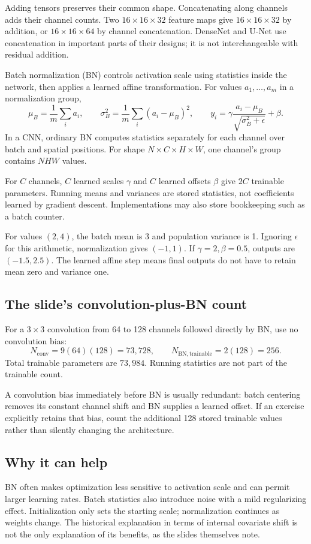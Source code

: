 Adding tensors preserves their common shape. Concatenating along channels adds their channel counts. Two $16\times16\times32$ feature maps give $16\times16\times32$ by addition, or $16\times16\times64$ by channel concatenation. DenseNet and U-Net use concatenation in important parts of their designs; it is not interchangeable with residual addition.

Batch normalization (BN) controls activation scale using statistics inside the network, then applies a learned affine transformation. For values $a_1,\ldots,a_m$ in a normalization group,
\[
\mu_B=\frac1m\sum_i a_i,\qquad
\sigma_B^2=\frac1m\sum_i(a_i-\mu_B)^2,\qquad
y_i=\gamma\frac{a_i-\mu_B}{\sqrt{\sigma_B^2+\epsilon}}+\beta.
\]
In a CNN, ordinary BN computes statistics separately for each channel over batch and spatial positions. For shape $N\times C\times H\times W$, one channel's group contains $NHW$ values.

For $C$ channels, $C$ learned scales $\gamma$ and $C$ learned offsets $\beta$ give $2C$ trainable parameters. Running means and variances are stored statistics, not coefficients learned by gradient descent. Implementations may also store bookkeeping such as a batch counter.

For values $(2,4)$, the batch mean is 3 and population variance is 1. Ignoring $\epsilon$ for this arithmetic, normalization gives $(-1,1)$. If $\gamma=2,\beta=0.5$, outputs are $(-1.5,2.5)$. The learned affine step means final outputs do not have to retain mean zero and variance one.

\subsection{The slide's convolution-plus-BN count}
For a $3\times3$ convolution from 64 to 128 channels followed directly by BN, use no convolution bias:
\[
N_{\mathrm{conv}}=9(64)(128)=73{,}728,\qquad
N_{\mathrm{BN,trainable}}=2(128)=256.
\]
Total trainable parameters are $73{,}984$. Running statistics are not part of the trainable count.

A convolution bias immediately before BN is usually redundant: batch centering removes its constant channel shift and BN supplies a learned offset. If an exercise explicitly retains that bias, count the additional 128 stored trainable values rather than silently changing the architecture.

\subsection{Why it can help}
BN often makes optimization less sensitive to activation scale and can permit larger learning rates. Batch statistics also introduce noise with a mild regularizing effect. Initialization only sets the starting scale; normalization continues as weights change. The historical explanation in terms of internal covariate shift is not the only explanation of its benefits, as the slides themselves note.

